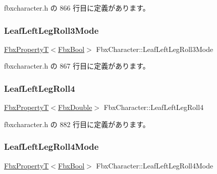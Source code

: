  fbxcharacter.\+h の 866 行目に定義があります。

\mbox{\label{class_fbx_character_a60007564e199c6446a6fccd3c96b3d27}} 
\subsubsection{\texorpdfstring{Leaf\+Left\+Leg\+Roll3\+Mode}{LeafLeftLegRoll3Mode}}
{\footnotesize\ttfamily \hyperlink{class_fbx_property_t}{Fbx\+PropertyT}$<$\hyperlink{fbxtypes_8h_a92e0562b2fe33e76a242f498b362262e}{Fbx\+Bool}$>$ Fbx\+Character\+::\+Leaf\+Left\+Leg\+Roll3\+Mode}



 fbxcharacter.\+h の 867 行目に定義があります。

\mbox{\label{class_fbx_character_a9b83334b1cf885a85b9679e267e54093}} 
\subsubsection{\texorpdfstring{Leaf\+Left\+Leg\+Roll4}{LeafLeftLegRoll4}}
{\footnotesize\ttfamily \hyperlink{class_fbx_property_t}{Fbx\+PropertyT}$<$\hyperlink{fbxtypes_8h_a171e72a1c46fc15c1a6c9c31948c1c5b}{Fbx\+Double}$>$ Fbx\+Character\+::\+Leaf\+Left\+Leg\+Roll4}



 fbxcharacter.\+h の 882 行目に定義があります。

\mbox{\label{class_fbx_character_ab3c7bdee28e6e855e6e5ef53ad053689}} 
\subsubsection{\texorpdfstring{Leaf\+Left\+Leg\+Roll4\+Mode}{LeafLeftLegRoll4Mode}}
{\footnotesize\ttfamily \hyperlink{class_fbx_property_t}{Fbx\+PropertyT}$<$\hyperlink{fbxtypes_8h_a92e0562b2fe33e76a242f498b362262e}{Fbx\+Bool}$>$ Fbx\+Character\+::\+Leaf\+Left\+Leg\+Roll4\+Mode}



